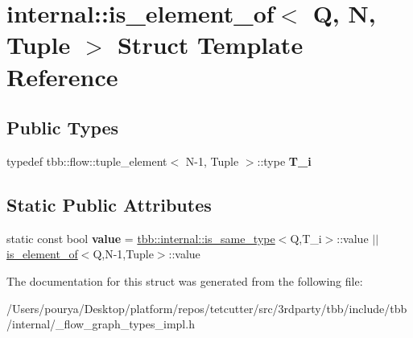 \hypertarget{structinternal_1_1is__element__of}{}\section{internal\+:\+:is\+\_\+element\+\_\+of$<$ Q, N, Tuple $>$ Struct Template Reference}
\label{structinternal_1_1is__element__of}
\subsection*{Public Types}
\begin{DoxyCompactItemize}
\item 
\hypertarget{structinternal_1_1is__element__of_ad6cca6cadfc0e9de1ab01db5b6e9ce12}{}typedef tbb\+::flow\+::tuple\+\_\+element$<$ N-\/1, Tuple $>$\+::type {\bfseries T\+\_\+i}\label{structinternal_1_1is__element__of_ad6cca6cadfc0e9de1ab01db5b6e9ce12}

\end{DoxyCompactItemize}
\subsection*{Static Public Attributes}
\begin{DoxyCompactItemize}
\item 
\hypertarget{structinternal_1_1is__element__of_a13d8593e5f58769b7bd4ae513690fbd4}{}static const bool {\bfseries value} = \hyperlink{structtbb_1_1internal_1_1is__same__type}{tbb\+::internal\+::is\+\_\+same\+\_\+type}$<$Q,T\+\_\+i$>$\+::value $\vert$$\vert$ \hyperlink{structinternal_1_1is__element__of}{is\+\_\+element\+\_\+of}$<$Q,N-\/1,Tuple$>$\+::value\label{structinternal_1_1is__element__of_a13d8593e5f58769b7bd4ae513690fbd4}

\end{DoxyCompactItemize}


The documentation for this struct was generated from the following file\+:\begin{DoxyCompactItemize}
\item 
/\+Users/pourya/\+Desktop/platform/repos/tetcutter/src/3rdparty/tbb/include/tbb/internal/\+\_\+flow\+\_\+graph\+\_\+types\+\_\+impl.\+h\end{DoxyCompactItemize}
